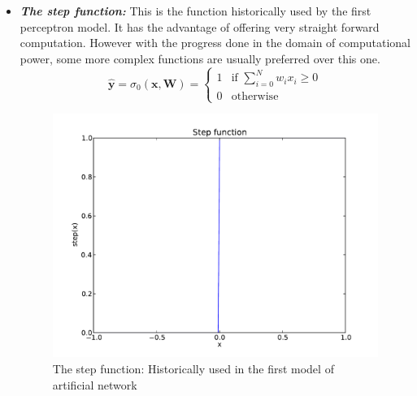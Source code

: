 \documentclass[a4paper,11pt]{report}
\newcommand{\Important}[1]{\textbf{{\em #1}}}
\begin{document}
			\begin{itemize}
				\item \Important{The step function:} This is the function historically used by the first perceptron model. It has the advantage of offering very straight forward computation. However with the progress done in the domain of computational power, some more complex functions are usually preferred over this one.\\
				\begin{equation}
					\mathbf{\hat{y}} = \sigma_{0}(\mathbf{x}, \mathbf{W}) =         
					\begin{cases}
						1  & \text{if } \sum_{i=0}^{N} w_{i} x_{i} \geq 0 \\
						0 & \text{otherwise}
					\end{cases} 
				\end{equation}
				\begin{figure}[H]
					\begin{center}
						\includegraphics[width=3 in]{Images/NN/step.pdf}
						\caption[Activation function: The step function]{The step function: Historically used in the first model of artificial network}
						\label{fig:The step function}
					\end{center}
				\end{figure}
       

\end{itemize}
\end{document}
